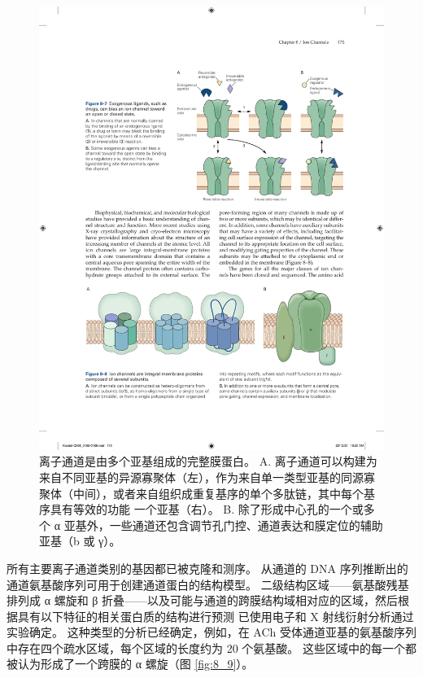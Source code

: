 \begin{figure}[htbp]
	\centering
	\includegraphics[width=1.0\linewidth]{chap08/fig_8_8}
	\caption{离子通道是由多个亚基组成的完整膜蛋白。 A. 离子通道可以构建为来自不同亚基的异源寡聚体（左），作为来自单一类型亚基的同源寡聚体（中间），或者来自组织成重复基序的单个多肽链，其中每个基序具有等效的功能 一个亚基（右）。 B. 除了形成中心孔的一个或多个 α 亚基外，一些通道还包含调节孔门控、通道表达和膜定位的辅助亚基（b 或 γ）。}
	\label{fig:8_8}
\end{figure}


所有主要离子通道类别的基因都已被克隆和测序。 
从通道的 DNA 序列推断出的通道氨基酸序列可用于创建通道蛋白的结构模型。 
二级结构区域——氨基酸残基排列成 α 螺旋和 β 折叠——以及可能与通道的跨膜结构域相对应的区域，然后根据具有以下特征的相关蛋白质的结构进行预测 已使用电子和 X 射线衍射分析通过实验确定。 
这种类型的分析已经确定，例如，在 ACh 受体通道亚基的氨基酸序列中存在四个疏水区域，每个区域的长度约为 20 个氨基酸。 
这些区域中的每一个都被认为形成了一个跨膜的 α 螺旋（图 \ref{fig:8_9}）。

